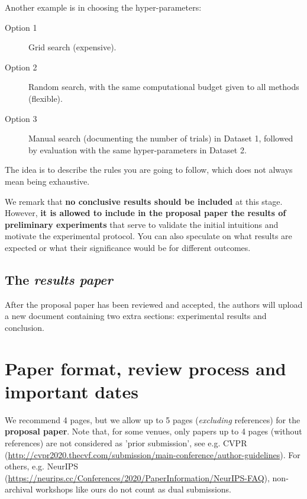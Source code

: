 \documentclass{article}
\begin{document}
Another example is in choosing the hyper-parameters:

\begin{description}
\item[Option 1] Grid search (expensive).
\item[Option 2] Random search, with the same computational budget given to all methods (flexible).
\item[Option 3] Manual search (documenting the number of trials) in Dataset 1, followed by evaluation with the same hyper-parameters in Dataset 2.
\end{description}

The idea is to describe the rules you are going to follow, which does not always mean being exhaustive.

We remark that \textbf{no conclusive results should be included} at this stage.
However, \textbf{it is allowed to include in the proposal paper the results of preliminary experiments} that serve to validate the initial intuitions and motivate the experimental protocol.
You can also speculate on what results are expected or what their significance would be for different outcomes.

\subsection{The \emph{results paper}}
\label{sec:post}
After the proposal paper has been reviewed and accepted, the authors will upload a new document containing two extra sections: experimental results and conclusion.

\section{Paper format, review process and important dates}


We recommend 4 pages, but we allow up to 5 pages (\emph{excluding} references) for the \textbf{proposal paper}. Note that, for some venues, only papers up to 4 pages (without references) are not considered as 'prior submission', see e.g. CVPR (\url{http://cvpr2020.thecvf.com/submission/main-conference/author-guidelines}). For others, e.g. NeurIPS (\url{https://neurips.cc/Conferences/2020/PaperInformation/NeurIPS-FAQ}), non-archival workshops like ours do not count as dual submissions.
\end{document}
